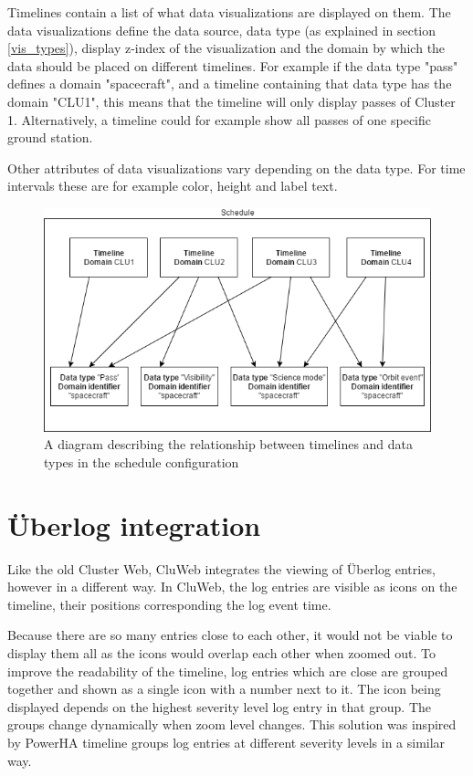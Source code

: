Timelines contain a list of what data visualizations are displayed on them. The data visualizations define the data source, data type (as explained in section \ref{vis_types}), display z-index of the visualization and the domain by which the data should be placed on different timelines. For example if the data type "pass" defines a domain "spacecraft", and a timeline containing that data type has the domain "CLU1", this means that the timeline will only display passes of Cluster 1. Alternatively, a timeline could for example show all passes of one specific ground station.

Other attributes of data visualizations vary depending on the data type. For time intervals these are for example color, height and label text.

\begin{figure}[ht]
  \begin{center}
    \includegraphics*[width=1\textwidth]{schedule_diagram}
  \end{center}
  \caption{A diagram describing the relationship between timelines and data types in the schedule configuration}
  \label{fig:schedule_diagram}
\end{figure}


\section{Überlog integration}
Like the old Cluster Web, CluWeb integrates the viewing of Überlog entries, however in a different way. In CluWeb, the log entries are visible as icons on the timeline, their positions corresponding the log event time. 

Because there are so many entries close to each other, it would not be viable to display them all as the icons would overlap each other when zoomed out. To improve the readability of the timeline, log entries which are close are grouped together and shown as a single icon with a number next to it. The icon being displayed depends on the highest severity level log entry in that group. The groups change dynamically when zoom level changes. This solution was inspired by PowerHA timeline groups log entries at different severity levels in a similar way. \cite{ibm_timeline}

